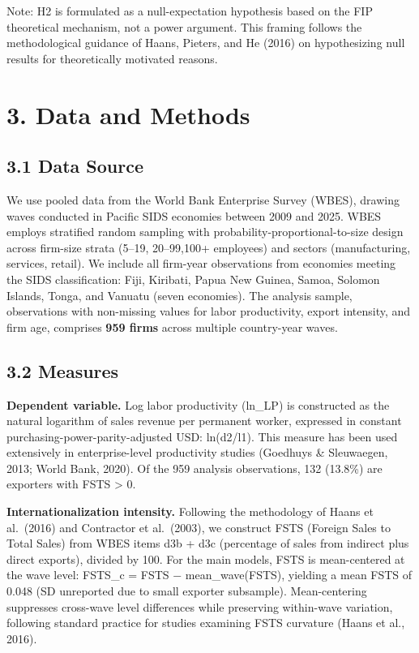 \documentclass[
  12pt]{article}
\begin{document}
Note: H2 is formulated as a null-expectation hypothesis based on the FIP
theoretical mechanism, not a power argument. This framing follows the
methodological guidance of Haans, Pieters, and He (2016) on
hypothesizing null results for theoretically motivated reasons.

\hypertarget{data-and-methods}{%
\section{3. Data and Methods}\label{data-and-methods}}

\hypertarget{data-source}{%
\subsection{3.1 Data Source}\label{data-source}}

We use pooled data from the World Bank Enterprise Survey (WBES), drawing
waves conducted in Pacific SIDS economies between 2009 and 2025. WBES
employs stratified random sampling with probability-proportional-to-size
design across firm-size strata (5--19, 20--99,100+ employees) and
sectors (manufacturing, services, retail). We include all firm-year
observations from economies meeting the SIDS classification: Fiji,
Kiribati, Papua New Guinea, Samoa, Solomon Islands, Tonga, and Vanuatu
(seven economies). The analysis sample, observations with non-missing
values for labor productivity, export intensity, and firm age, comprises
\textbf{959 firms} across multiple country-year waves.

\hypertarget{measures}{%
\subsection{3.2 Measures}\label{measures}}

\textbf{Dependent variable.} Log labor productivity (ln\_LP) is
constructed as the natural logarithm of sales revenue per permanent
worker, expressed in constant purchasing-power-parity-adjusted USD:
ln(d2/l1). This measure has been used extensively in enterprise-level
productivity studies (Goedhuys \& Sleuwaegen, 2013; World Bank, 2020).
Of the 959 analysis observations, 132 (13.8\%) are exporters with FSTS
\textgreater{} 0.

\textbf{Internationalization intensity.} Following the methodology of
Haans et al.~(2016) and Contractor et al.~(2003), we construct FSTS
(Foreign Sales to Total Sales) from WBES items d3b + d3c (percentage of
sales from indirect plus direct exports), divided by 100. For the main
models, FSTS is mean-centered at the wave level: FSTS\_c = FSTS −
mean\_wave(FSTS), yielding a mean FSTS of 0.048 (SD unreported due to
small exporter subsample). Mean-centering suppresses cross-wave level
differences while preserving within-wave variation, following standard
practice for studies examining FSTS curvature (Haans et al., 2016).
\end{document}
